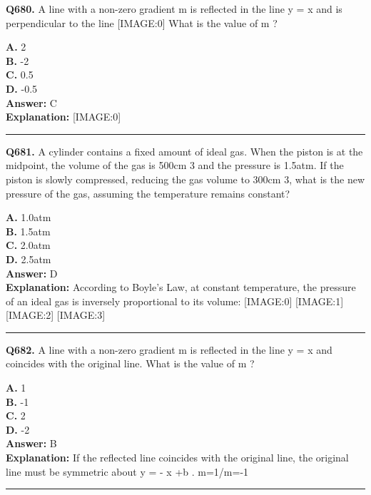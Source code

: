 \documentclass[12pt]{article}
\begin{document}
\noindent
\textbf{Q680.} A line with a non-zero gradient
m
is reflected in the line
y
=
x
and is perpendicular to the line
[IMAGE:0]
What is the value of
m
?



\textbf{A.} 2 \\
\textbf{B.} -2 \\
\textbf{C.} 0.5 \\
\textbf{D.} -0.5 \\

\textbf{Answer:} C \\
\textbf{Explanation:} [IMAGE:0]

\hrule
\vspace{1em}


\noindent
\textbf{Q681.} A cylinder contains a fixed amount of ideal gas. When the piston is at the midpoint, the volume of the gas is 500cm
3
and the pressure is 1.5atm. If the piston is slowly compressed, reducing the gas volume to 300cm
3,
what is the new pressure of the gas, assuming the temperature remains constant?



\textbf{A.} 1.0atm \\
\textbf{B.} 1.5atm \\
\textbf{C.} 2.0atm \\
\textbf{D.} 2.5atm \\

\textbf{Answer:} D \\
\textbf{Explanation:} According to Boyle's Law, at constant temperature, the pressure of an ideal gas is inversely proportional to its volume:
[IMAGE:0]
[IMAGE:1]
[IMAGE:2]
[IMAGE:3]

\hrule
\vspace{1em}


\noindent
\textbf{Q682.} A line with a non-zero gradient
m
is reflected in the line
y
=
x
and coincides with the original line. What is the value of
m
?



\textbf{A.} 1 \\
\textbf{B.} -1 \\
\textbf{C.} 2 \\
\textbf{D.} -2 \\

\textbf{Answer:} B \\
\textbf{Explanation:} If the reflected line coincides with the original line, the original line must be symmetric about
y
=
-
x
+b
.
m=1/m=-1

\hrule
\vspace{1em}
\end{document}
